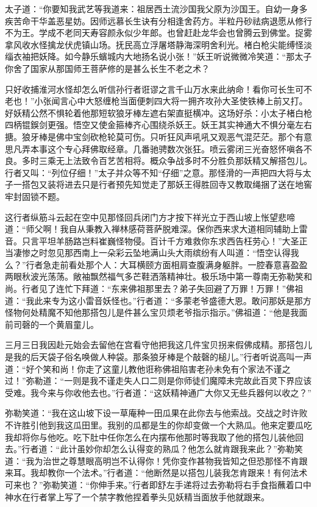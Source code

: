 \documentclass[12pt,UTF8]{ctexbook}
\begin{document}
太子道：“你要知我武艺等我道来：祖居西土流沙国我父原为沙国王。自幼一身多疾苦命干华盖恶星妨。因师远慕长生诀有分相逢舍药方。半粒丹砂祛病退愿从修行不为王。学成不老同天寿容颜永似少年郎。也曾赶赴龙华会也曾腾云到佛堂。捉雾拿风收水怪擒龙伏虎镇山场。抚民高立浮屠塔静海深明舍利光。楮白枪尖能缚怪淡缁衣袖把妖降。如今静乐蠙城内大地扬名说小张！”妖王听说微微冷笑道：“那太子你舍了国家从那国师王菩萨修的是甚么长生不老之术？

只好收捕淮河水怪却怎么听信孙行者诳谬之言千山万水来此纳命！看你可长生可不老也！”小张闻言心中大怒缠枪当面便刺四大将一拥齐攻孙大圣使铁棒上前又打。好妖精公然不惧轮着他那短软狼牙棒左遮右架直挺横冲。这场好杀：小太子楮白枪四柄锟鋘剑更强。悟空又使金箍棒齐心围绕杀妖王。妖王其实神通大不惧分毫左右搪。狼牙棒是佛中宝剑砍枪轮莫可伤。只听狂风声吼吼又观恶气混茫茫。那个有意思凡弄本事这个专心拜佛取经章。几番驰骋数次张狂。喷云雾闭三光奋怒怀嗔各不良。多时三乘无上法致令百艺苦相将。概众争战多时不分胜负那妖精又解搭包儿。行者又叫：“列位仔细！”太子并众等不知“仔细”之意。那怪滑的一声把四大将与太子一搭包又装将进去只是行者预先知觉走了那妖王得胜回寺又教取绳捆了送在地窖牢封固锁不题。

这行者纵筋斗云起在空中见那怪回兵闭门方才按下祥光立于西山坡上怅望悲啼道：“师父啊！我自从秉教入禅林感荷菩萨脱难深。保你西来求大道相同辅助上雷音。只言平坦羊肠路岂料崔巍怪物侵。百计千方难救你东求西告枉劳心！”大圣正当凄惨之时忽见那西南上一朵彩云坠地满山头大雨缤纷有人叫道：“悟空认得我么？”行者急走前看处那个人：大耳横颐方面相肩查腹满身躯胖。一腔春意喜盈盈两眼秋波光荡荡。敞袖飘然福气多芒鞋洒落精神壮。极乐场中第一尊南无弥勒笑和尚。行者见了连忙下拜道：“东来佛祖那里去？弟子失回避了万罪！万罪！”佛祖道：“我此来专为这小雷音妖怪也。”行者道：“多蒙老爷盛德大恩。敢问那妖是那方怪物何处精魔不知他那搭包儿是件甚么宝贝烦老爷指示指示。”佛祖道：“他是我面前司磬的一个黄眉童儿。

三月三日我因赴元始会去留他在宫看守他把我这几件宝贝拐来假佛成精。那搭包儿是我的后天袋子俗名唤做人种袋。那条狼牙棒是个敲磬的槌儿。”行者听说高叫一声道：“好个笑和尚！你走了这童儿教他诳称佛祖陷害老孙未免有个家法不谨之过！”弥勒道：“一则是我不谨走失人口二则是你师徒们魔障未完故此百灵下界应该受难。我今来与你收他去也。”行者道：“这妖精神通广大你又无些兵器何以收之？”

弥勒笑道：“我在这山坡下设一草庵种一田瓜果在此你去与他索战。交战之时许败不许胜引他到我这瓜田里。我别的瓜都是生的你却变做一个大熟瓜。他来定要瓜吃我却将你与他吃。吃下肚中任你怎么在内摆布他那时等我取了他的搭包儿装他回去。”行者道：“此计虽妙你却怎么认得变的熟瓜？他怎么就肯跟我来此？”弥勒笑道：“我为治世之尊慧眼高明岂不认得你！凭你变作甚物我皆知之但恐那怪不肯跟来耳。我却教你一个法术。”行者道：“他断然是以搭包儿装我怎肯跟来！有何法术可来也？”弥勒笑道：“你伸手来。”行者即舒左手递将过去弥勒将右手食指蘸着口中神水在行者掌上写了一个禁字教他捏着拳头见妖精当面放手他就跟来。
\end{document}
